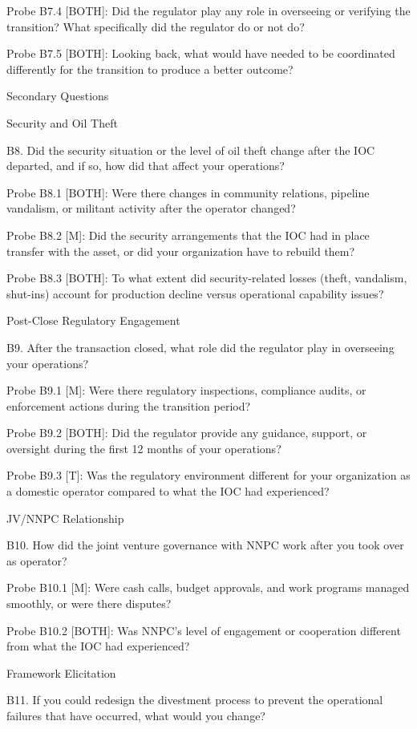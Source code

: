 Probe B7.4 {[}BOTH{]}: Did the regulator play any role in overseeing or
verifying the transition? What specifically did the regulator do or not
do?

Probe B7.5 {[}BOTH{]}: Looking back, what would have needed to be
coordinated differently for the transition to produce a better outcome?

Secondary Questions

Security and Oil Theft

B8. Did the security situation or the level of oil theft change after
the IOC departed, and if so, how did that affect your operations?

Probe B8.1 {[}BOTH{]}: Were there changes in community relations,
pipeline vandalism, or militant activity after the operator changed?

Probe B8.2 {[}M{]}: Did the security arrangements that the IOC had in
place transfer with the asset, or did your organization have to rebuild
them?

Probe B8.3 {[}BOTH{]}: To what extent did security-related losses
(theft, vandalism, shut-ins) account for production decline versus
operational capability issues?

Post-Close Regulatory Engagement

B9. After the transaction closed, what role did the regulator play in
overseeing your operations?

Probe B9.1 {[}M{]}: Were there regulatory inspections, compliance
audits, or enforcement actions during the transition period?

Probe B9.2 {[}BOTH{]}: Did the regulator provide any guidance, support,
or oversight during the first 12 months of your operations?

Probe B9.3 {[}T{]}: Was the regulatory environment different for your
organization as a domestic operator compared to what the IOC had
experienced?

JV/NNPC Relationship

B10. How did the joint venture governance with NNPC work after you took
over as operator?

Probe B10.1 {[}M{]}: Were cash calls, budget approvals, and work
programs managed smoothly, or were there disputes?

Probe B10.2 {[}BOTH{]}: Was NNPC's level of engagement or cooperation
different from what the IOC had experienced?

Framework Elicitation

B11. If you could redesign the divestment process to prevent the
operational failures that have occurred, what would you change?

